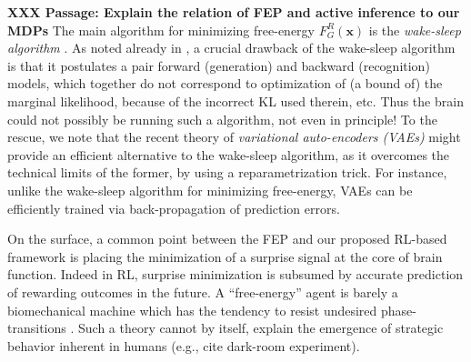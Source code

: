 \documentclass[10pt,letterpaper]{article}
\def\x{\mathbf{x}}
\begin{document}
\textbf{XXX Passage: Explain the relation of FEP and active inference to our MDPs}
The main algorithm for minimizing free-energy $F_G^R(\x)$ is the \textit{wake-sleep algorithm}
\citep{dayan1995helmholtz}. As noted already in \citep{dayan1995helmholtz},
a crucial drawback of the wake-sleep algorithm is that it postulates a pair forward (generation) and backward (recognition) models,
which together do not correspond to optimization of (a bound of) the marginal likelihood, because of the incorrect KL used therein, etc.
Thus the brain could not possibly be running such a algorithm, not even in principle! To the rescue, we note that the recent theory of
\textit{variational auto-encoders (VAEs)} \citep{kingma2013auto} might provide an efficient alternative to the wake-sleep algorithm,
as it overcomes the technical limits of the former, by using a reparametrization trick. For instance, unlike the wake-sleep algorithm
for minimizing free-energy, VAEs can be efficiently trained via back-propagation of prediction errors.

On the surface, a common point between the FEP and our proposed RL-based framework
  is placing the minimization of a surprise signal at the core of brain function.
  Indeed in RL, surprise minimization is subsumed  by accurate prediction of
  rewarding outcomes in the future. A ``free-energy'' agent is barely a biomechanical machine which has the tendency to resist undesired phase-transitions
  \citep{friston2010free,fristonAIorRL,ortega2013thermodynamics}. Such a theory cannot by itself,
  explain the emergence of strategic behavior inherent in humans (e.g.,  cite dark-room experiment).

\end{document}
